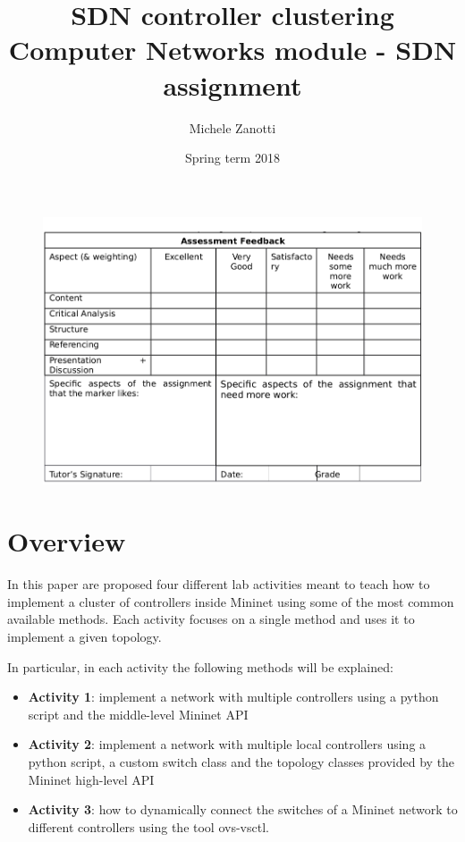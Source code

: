 \documentclass[12pt, a4paper]{article}
\title{SDN controller clustering \\ \large Computer Networks module - SDN assignment}
\author{Michele Zanotti}
\date{Spring term 2018}
\begin{document}
\maketitle
\begin{figure}[htb]
	\centering
	\includegraphics[width=1\linewidth]{img/valuation-table.png}
\end{figure}

\newpage





\section*{Overview}
In this paper are proposed four different lab activities meant to teach how to implement
a cluster of controllers inside Mininet using some of the most common available methods.
Each activity focuses on a single method and uses it to implement a given topology.

In particular, in each activity the following methods will be explained:
\begin{itemize}
  \item \textbf{Activity 1}: implement a network with multiple controllers using a python
  script and the middle-level Mininet API
  \item \textbf{Activity 2}: implement a network with multiple local controllers using a python
  script, a custom switch class and the topology classes provided by the Mininet high-level API
  \item \textbf{Activity 3}: how to dynamically connect the switches of a Mininet
  network to different controllers using the tool ovs-vsctl.
\end{itemize}
\end{document}
